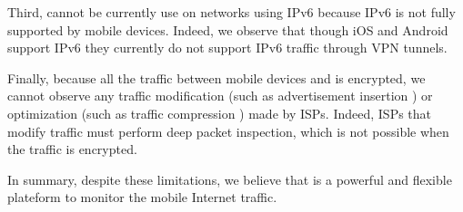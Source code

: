Third, \platname{} cannot be currently use on networks using IPv6
because IPv6 is not fully supported by mobile devices. Indeed, we
observe that though iOS and Android support IPv6 they currently do not
support IPv6 traffic through VPN tunnels.

Finally, because all the traffic between mobile devices and \platname{}
is encrypted, we cannot observe any traffic modification (such as
advertisement insertion ) or optimization
(such as traffic compression ) made by
ISPs. Indeed, ISPs that modify traffic must perform deep packet
inspection, which is not possible when the traffic is encrypted.  

In summary, despite these limitations, we believe that \platname is a
powerful and flexible plateform to monitor the mobile Internet traffic.








